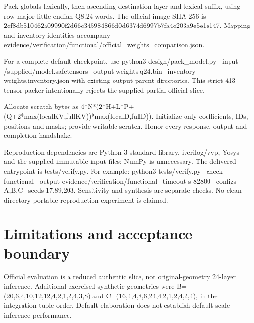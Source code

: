 \documentclass[11pt,a4paper]{article}
\begin{document}
Pack globals lexically,\allowbreak{} then ascending destination layer and lexical suffix,\allowbreak{} using row-major little-endian Q8.24 words. The official image SHA-256 is 2cf8db51\allowbreak{}0462a099\allowbreak{}90f2d66c\allowbreak{}34598486\allowbreak{}6d0d6374\allowbreak{}d6997b7f\allowbreak{}a4c203a9\allowbreak{}e5e1e147. Mapping and inventory identities accompany evidence/\allowbreak{}verification/\allowbreak{}functional/\allowbreak{}official\_\allowbreak{}weights\_\allowbreak{}comparison.json.


For a complete default checkpoint,\allowbreak{} use python3 design/\allowbreak{}pack\_\allowbreak{}model.py --input /\allowbreak{}supplied/\allowbreak{}model.safetensors --output weights.q24.bin --inventory weights.inventory.json with existing output parent directories. This strict 413-tensor packer intentionally rejects the supplied partial official slice.


Allocate scratch bytes as 4*\allowbreak{}N*\allowbreak{}(\allowbreak{}2*\allowbreak{}H+\allowbreak{}L*\allowbreak{}P+\allowbreak{}(\allowbreak{}Q+\allowbreak{}2*\allowbreak{}max(\allowbreak{}localKV,\allowbreak{}fullKV)\allowbreak{})\allowbreak{}*\allowbreak{}max(\allowbreak{}localD,\allowbreak{}fullD)\allowbreak{})\allowbreak{}. Initialize only coefficients,\allowbreak{} IDs,\allowbreak{} positions and masks; provide writable scratch. Honor every response,\allowbreak{} output and completion handshake.


Reproduction dependencies are Python 3 standard library,\allowbreak{} iverilog/\allowbreak{}vvp,\allowbreak{} Yosys and the supplied immutable input files; NumPy is unnecessary. The delivered entrypoint is tests/\allowbreak{}verify.py. For example: python3 tests/\allowbreak{}verify.py --check functional --output evidence/\allowbreak{}verification/\allowbreak{}functional --timeout-s 82800 --configs A,\allowbreak{}B,\allowbreak{}C --seeds 17,\allowbreak{}89,\allowbreak{}203. Sensitivity and synthesis are separate checks. No clean-directory portable-reproduction experiment is claimed.


\section{Limitations and acceptance boundary}

Official evaluation is a reduced authentic slice,\allowbreak{} not original-geometry 24-layer inference. Additional exercised synthetic geometries were B=\allowbreak{}(\allowbreak{}20,\allowbreak{}6,\allowbreak{}4,\allowbreak{}10,\allowbreak{}12,\allowbreak{}12,\allowbreak{}4,\allowbreak{}2,\allowbreak{}1,\allowbreak{}2,\allowbreak{}4,\allowbreak{}3,\allowbreak{}8)\allowbreak{} and C=\allowbreak{}(\allowbreak{}16,\allowbreak{}4,\allowbreak{}4,\allowbreak{}8,\allowbreak{}6,\allowbreak{}24,\allowbreak{}4,\allowbreak{}2,\allowbreak{}1,\allowbreak{}2,\allowbreak{}4,\allowbreak{}2,\allowbreak{}4)\allowbreak{},\allowbreak{} in the integration tuple order. Default elaboration does not establish default-scale inference performance.
\end{document}
